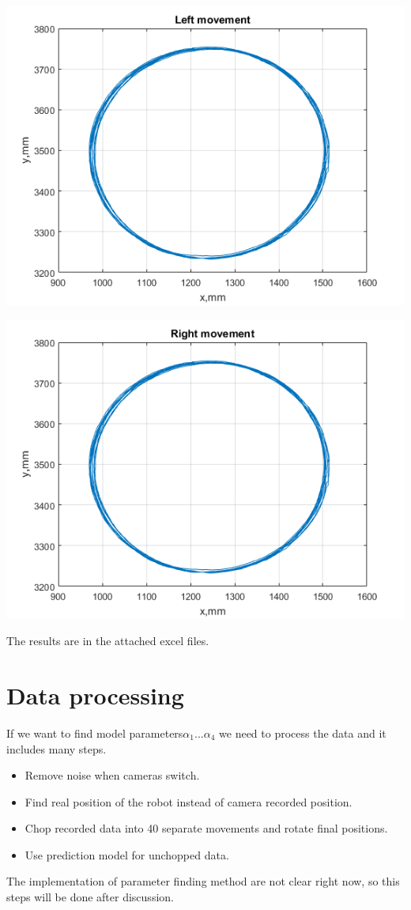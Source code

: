 \documentclass[a4paper, 12pt]{article}
\begin{document}
\begin{center}
  \includegraphics[scale = 0.8]{ll.png}
  
  \includegraphics[scale = 0.8]{rr.png}
\end{center}

The results are in the attached excel files.

\section{Data processing}
If we want to find model parameters$\alpha_1 ...\alpha_4$ we need to process the data and it includes many steps.

\begin{itemize}
\item Remove noise when cameras switch.
\item Find real position of the robot instead of camera recorded position.
\item Chop recorded data into 40 separate movements and rotate final positions.
\item Use prediction model for unchopped data.
\end{itemize}
The implementation of parameter finding method are not clear right now, so this steps will be done after discussion.
\end{document}
